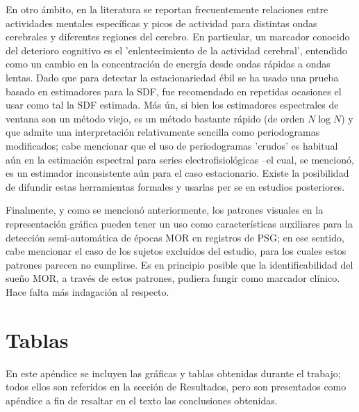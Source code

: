 \documentclass[12pt,a4paper]{mitthesis}
\begin{document}
En otro \'ambito, en la literatura se reportan frecuentemente relaciones entre actividades mentales 
espec\'ificas y picos de actividad para distintas ondas cerebrales y diferentes regiones del 
cerebro.
En particular, un marcador conocido del deterioro cognitivo es el 'enlentecimiento de la actividad
cerebral', entendido como un cambio en la concentraci\'on de energ\'ia desde ondas r\'apidas a 
ondas lentas.
Dado que para detectar la estacionariedad \'ebil se ha usado una prueba basado en estimadores para la 
SDF, fue recomendado en repetidas ocasiones el usar como tal la SDF estimada. 
M\'as \'un, si bien los estimadores espectrales de ventana son un m\'etodo viejo, es un m\'etodo 
bastante r\'apido (de orden $N \log{N}$) y que admite una interpretaci\'on relativamente sencilla 
como periodogramas modificados; cabe mencionar que el uso de periodogramas 'crudos' es habitual 
a\'un en la estimaci\'on espectral para series electrofisiol\'ogicas --el cual, se mencion\'o, es 
un estimador inconsistente a\'un para el caso estacionario.
Existe la posibilidad de difundir estas herramientas formales y usarlas per se en estudios
posteriores.


Finalmente, y como se mencion\'o anteriormente, los patrones visuales en la representaci\'on 
gr\'afica pueden tener un uso como caracter\'isticas auxiliares para la detecci\'on 
semi-autom\'atica de \'epocas MOR en registros de PSG; en ese sentido, cabe mencionar el caso de 
los sujetos exclu\'idos del estudio, para los cuales estos patrones parecen no cumplirse. 
Es en principio posible que la identificabilidad del sue\~no MOR, a trav\'es de estos patrones, 
pudiera fungir como marcador cl\'inico. Hace falta m\'as indagaci\'on al respecto. 


\appendix

\chapter{Tablas}

En este ap\'endice se incluyen las gr\'aficas y tablas obtenidas durante el trabajo; todos ellos 
son referidos en la secci\'on de Resultados, pero son presentados como ap\'endice a fin de resaltar 
en el texto las conclusiones obtenidas.
\end{document}
